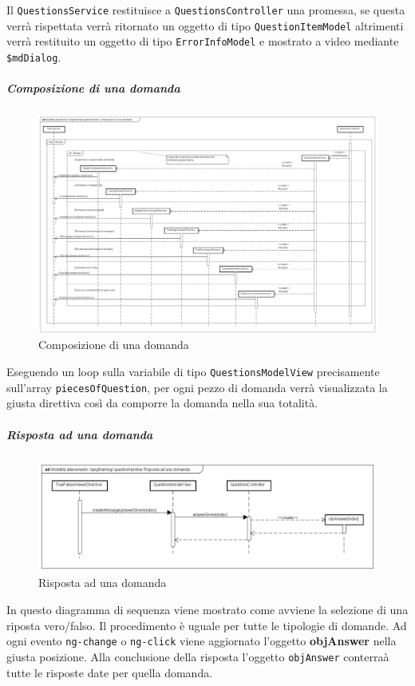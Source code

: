 Il \texttt{QuestionsService} restituisce a \texttt{QuestionsController} una promessa, se questa verrà rispettata verrà ritornato un oggetto di tipo \texttt{QuestionItemModel} altrimenti verrà restituito un oggetto di tipo \texttt{ErrorInfoModel} e mostrato a video mediante \texttt{\$mdDialog}.


\subparagraph{Composizione di una domanda}

\label{Composizione di una domanda}

\begin{figure}[ht]
	\centering
	\includegraphics[scale=0.25,keepaspectratio]{UML/DiagrammiDiSequenza/Front-end/Training_makingAQuestion.png}
	\caption{Composizione di una domanda}
\end{figure} \FloatBarrier

Eseguendo un loop sulla variabile di tipo \texttt{QuestionsModelView} precisamente sull'array \texttt{piecesOfQuestion}, per ogni pezzo di domanda verrà visualizzata la giusta direttiva così da comporre la domanda nella sua totalità.

\subparagraph{Risposta ad una domanda}

\label{Risposta ad una domanda}

\begin{figure}[ht]
	\centering
	\includegraphics[scale=0.4,keepaspectratio]{UML/DiagrammiDiSequenza/Front-end/Training_answerAQuestion.png}
	\caption{Risposta ad una domanda}
\end{figure} \FloatBarrier

In questo diagramma di sequenza viene mostrato come avviene la selezione di una riposta vero/falso. Il procedimento è uguale per tutte le tipologie di domande. Ad ogni evento \texttt{ng-change} o \texttt{ng-click} viene aggiornato l'oggetto \textbf{objAnswer} nella giusta posizione. Alla conclusione della risposta l'oggetto \texttt{objAnswer} conterraà tutte le risposte date per quella domanda. 
